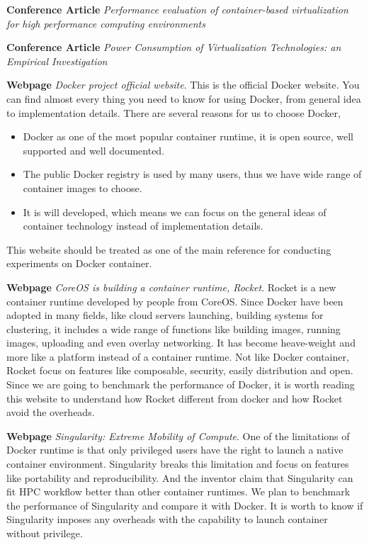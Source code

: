 \documentclass{article}
\begin{document}
\medskip

\textbf{Conference Article} \emph{Performance evaluation of container-based virtualization for 
high performance computing environments}\cite{xavier2013performance}

\medskip

\textbf{Conference Article} \emph{Power Consumption of Virtualization Technologies: an 
Empirical Investigation}\cite{morabito2015power}

\medskip

\textbf{Webpage} \emph{Docker project official website}\cite{dockerwb}. This is the official 
Docker website. You can find almost every thing you need to know for using Docker, from 
general idea to implementation details.  There are several reasons for us to choose Docker,
\begin{itemize}
    \item Docker as one of the most popular container runtime, it is open source, well supported 
        and well documented.
    \item The public Docker registry is used by many users, thus we have wide range of 
        container images to choose.
    \item It is will developed, which means we can focus on the general ideas of container technology
        instead of implementation details.
\end{itemize}
This website should be treated as one of the main reference for conducting experiments on Docker 
container.

\medskip

\textbf{Webpage} \emph{CoreOS is building a container runtime, Rocket}\cite{rocketwb}. Rocket is
a new container runtime developed by people from CoreOS. Since Docker have been adopted in many 
fields, like cloud servers launching, building systems for clustering, it includes a wide range
of functions like building images, running images, uploading and even overlay networking. It has 
become heave-weight and more like a platform instead of a container runtime. Not like Docker 
container, Rocket focus on features like composable, security, easily distribution and open. Since 
we are going to benchmark the performance of Docker, it is worth reading this website to understand
how Rocket different from docker and how Rocket avoid the overheads.

\medskip

\textbf{Webpage} \emph{Singularity: Extreme Mobility of Compute}\cite{singularity}. One of the 
limitations of Docker runtime is that only privileged users have the right to launch a native
container environment. Singularity breaks this limitation and focus on features like portability 
and reproducibility. And the inventor claim that Singularity can fit HPC workflow better 
than other container runtimes. We plan to benchmark the performance of Singularity and compare 
it with Docker. It is worth to know if Singularity imposes any overheads with the capability to 
launch container without privilege.  
\end{document}
